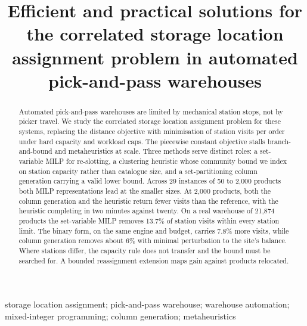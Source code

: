\documentclass[]{interact}
\begin{document}

\title{Efficient and practical solutions for the correlated storage location assignment problem in automated pick-and-pass warehouses}

\author{
}

\maketitle

\begin{abstract}
Automated pick-and-pass warehouses are limited by mechanical station stops, not by picker travel. We study the correlated storage location assignment problem for these systems, replacing the distance objective with minimisation of station visits per order under hard capacity and workload caps. The piecewise constant objective stalls branch-and-bound and metaheuristics at scale. Three methods serve distinct roles: a set-variable MILP for re-slotting, a clustering heuristic whose community bound we index on station capacity rather than catalogue size, and a set-partitioning column generation carrying a valid lower bound. Across 29 instances of 50 to 2,000 products both MILP representations lead at the smaller sizes. At 2,000 products, both the column generation and the heuristic return fewer visits than the reference, with the heuristic completing in two minutes against twenty. On a real warehouse of 21,874 products the set-variable MILP removes 13.7\% of station visits within every station limit. The binary form, on the same engine and budget, carries 7.8\% more visits, while column generation removes about 6\% with minimal perturbation to the site's balance. Where stations differ, the capacity rule does not transfer and the bound must be searched for. A bounded reassignment extension maps gain against products relocated.
\end{abstract}

\begin{keywords}
storage location assignment; pick-and-pass warehouse; warehouse automation; mixed-integer programming; column generation; metaheuristics
\end{keywords}
\end{document}
